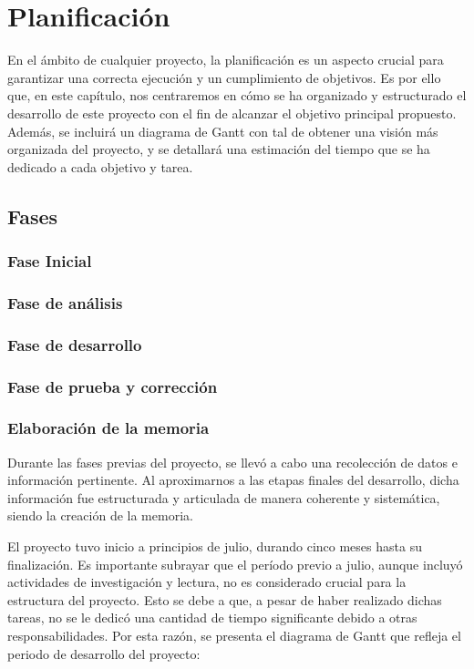\chapter{Planificación} \label{chap:planification}

En el ámbito de cualquier proyecto, la planificación es un aspecto crucial para garantizar una correcta ejecución y un cumplimiento de objetivos. Es por ello que, en este capítulo, nos centraremos en cómo se ha organizado y estructurado el desarrollo de este proyecto con el fin de alcanzar el objetivo principal propuesto. Además, se incluirá un diagrama de Gantt con tal de obtener una visión más organizada del proyecto, y se detallará una estimación del tiempo que se ha dedicado a cada objetivo y tarea.

\section{Fases}

\subsection{Fase Inicial}

\subsection{Fase de análisis}

\subsection {Fase de desarrollo}

\subsection{Fase de prueba y corrección}

\subsection{Elaboración de la memoria}

Durante las fases previas del proyecto, se llevó a cabo una recolección de datos e información pertinente. Al aproximarnos a las etapas finales del desarrollo, dicha información fue estructurada y articulada de manera coherente y sistemática, siendo la creación de la memoria.

El proyecto tuvo inicio a principios de julio, durando cinco meses hasta su finalización. Es importante subrayar que el período previo a julio, aunque incluyó actividades de investigación y lectura, no es considerado crucial para la estructura del proyecto. Esto se debe a que, a pesar de haber realizado dichas tareas, no se le dedicó una cantidad de tiempo significante debido a otras responsabilidades. Por esta razón, se presenta el diagrama de Gantt que refleja el periodo de desarrollo del proyecto:

